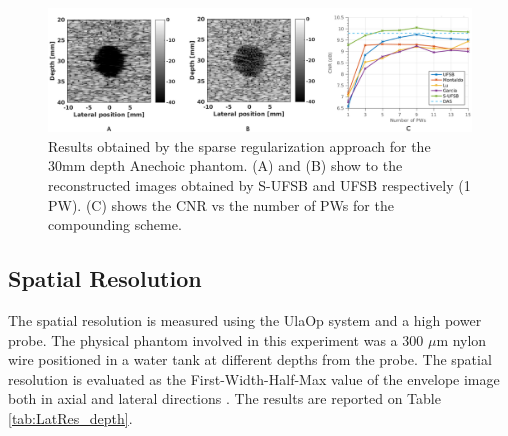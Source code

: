 \documentclass[conference]{IEEEtran}
\begin{document}
\begin{figure}[htb]
\centering    
\includegraphics[width=\textwidth]{ResultsIUS3}
\caption{Results obtained by the sparse regularization approach for the 30mm depth Anechoic phantom. (A) and (B) show to the reconstructed images obtained by S-UFSB and UFSB respectively (1 PW). (C) shows the CNR vs the number of PWs for the compounding scheme.}
\label{fig:ResSparse}
\end{figure}

\subsection{Spatial Resolution}
The spatial resolution is measured using the UlaOp system and a high power probe. The physical phantom involved in this experiment was a 300 $\mu$m nylon wire positioned in a water tank at different depths from the probe. The spatial resolution is evaluated as the First-Width-Half-Max value of the envelope image both in axial and lateral directions \cite{vanWijk_ULT_2002}. The results are reported on Table \ref{tab:LatRes_depth}. 
\end{document}
